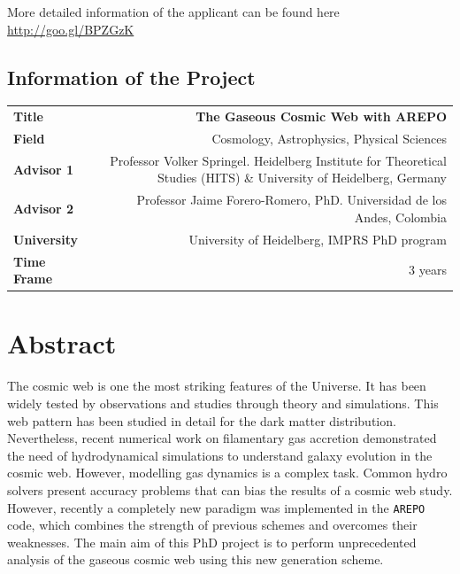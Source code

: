\documentclass[a4,useAMS,usenatbib,usegraphicx,12pt]{article}
\begin{document}
\vspace{10pt}

More detailed information of the applicant can be found here \url{http://goo.gl/BPZGzK}

\vspace{15pt}  

\subsection*{Information of the Project}
\begin{tabular}{L!{\VRule}R}
\bf Title		& \bf The Gaseous Cosmic Web with AREPO\\
\bf Field		& Cosmology, Astrophysics, Physical Sciences \\
\bf Advisor 1	& Professor Volker Springel. Heidelberg Institute for Theoretical Studies (HITS) 
\& University of Heidelberg, Germany \\
\bf Advisor 2	& Professor Jaime Forero-Romero, PhD. Universidad de los Andes, Colombia \\
\bf University	& University of Heidelberg, IMPRS PhD program \\
\bf Time Frame	& 3 years \\
\end{tabular}
\normalsize


\section{Abstract}


The cosmic web is one the most striking features of the Universe. It
has been widely tested by observations and studies through theory and
simulations. This web pattern has been studied in detail for the dark
matter distribution. Nevertheless, recent numerical work on
filamentary gas accretion demonstrated the need of hydrodynamical
simulations to understand galaxy evolution in the cosmic web. 
However, modelling gas dynamics is a complex task. Common hydro
solvers present accuracy problems that can bias the results of a
cosmic web study. However, recently a completely new paradigm
was implemented in the \texttt{AREPO} code, which combines the
strength of previous schemes and overcomes their weaknesses. The main
aim of this PhD project is to perform unprecedented analysis of the
gaseous cosmic web using this new generation scheme. 
\end{document}
